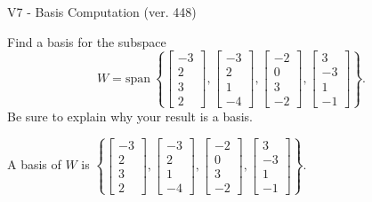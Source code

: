 \begin{exercise}
  \begin{exerciseTitle}V7 - Basis Computation (ver. 448)\end{exerciseTitle}
  \begin{exerciseStatement}
    Find a basis for the subspace 
\[W=\mathrm{span}\ \left\{\left[\begin{array}{r}
-3 \\
2 \\
3 \\
2
\end{array}\right] , \left[\begin{array}{r}
-3 \\
2 \\
1 \\
-4
\end{array}\right] , \left[\begin{array}{r}
-2 \\
0 \\
3 \\
-2
\end{array}\right] , \left[\begin{array}{r}
3 \\
-3 \\
1 \\
-1
\end{array}\right]\right\}.\]
 Be sure to explain why your result is a basis.


  \end{exerciseStatement}
  \begin{exerciseAnswer}
   A basis of \(W\) is  \(\left\{\left[\begin{array}{r}
-3 \\
2 \\
3 \\
2
\end{array}\right] , \left[\begin{array}{r}
-3 \\
2 \\
1 \\
-4
\end{array}\right] , \left[\begin{array}{r}
-2 \\
0 \\
3 \\
-2
\end{array}\right] , \left[\begin{array}{r}
3 \\
-3 \\
1 \\
-1
\end{array}\right]\right\}\).
  


  \end{exerciseAnswer}
\end{exercise}